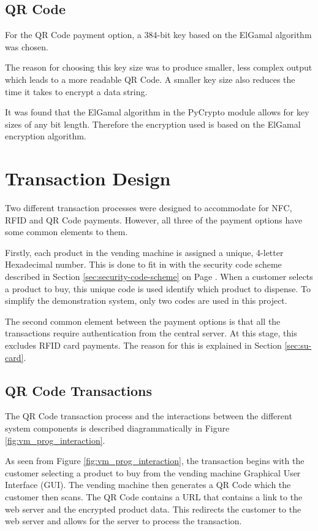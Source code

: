 \subsection{QR Code}

For the QR Code payment option, a 384-bit key based on the ElGamal algorithm was
chosen. 

The reason for choosing this key size was to produce smaller, less complex output which leads to a more readable QR Code. A smaller key size also reduces the time it takes to encrypt a data string.

It was found that the ElGamal algorithm in the PyCrypto module allows for key sizes of any bit
length. Therefore the encryption used is based on the ElGamal encryption algorithm.
 
\section{Transaction Design}
\label{sec:transaction}

Two different transaction processes were designed to accommodate for NFC, RFID
and QR Code payments. However, all three of the payment options have some common
elements to them. 

Firstly, each product in the vending machine is assigned a unique, 4-letter
Hexadecimal number. This is done to fit in with the security code scheme
described in Section \ref{sec:security-code-scheme} on Page
\pageref{sec:security-code-scheme}. When a customer selects a product to buy,
this unique code is used identify which product to dispense. To simplify the
demonstration system, only two codes are used in this project.

The second common element between the payment options is that all the
transactions require authentication from the central server. At this stage, this
excludes RFID card payments. The reason for this is explained in Section
\ref{sec:su-card}. 

\subsection{QR Code Transactions}

The QR Code transaction process and the interactions between the different
system components is described diagrammatically in Figure
\ref{fig:vm_prog_interaction}.

As seen from Figure \ref{fig:vm_prog_interaction}, the transaction begins with
the customer selecting a product to buy from the vending machine Graphical User
Interface (GUI). The vending machine then generates a QR Code which the customer
then scans. The QR Code contains a URL that contains a link to the web
server and the encrypted product data. This redirects the customer to the web
server and allows for the server to process the transaction.

